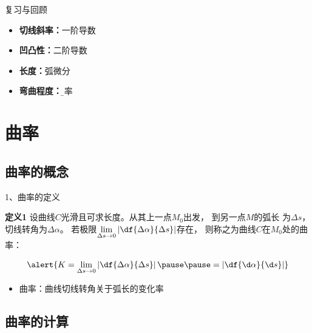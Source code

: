 \begin{frame}{复习与回顾}
	\linespread{1.5}
% 	
	
	\begin{itemize}
	  \item {\bf 切线斜率：}一阶导数
	  \item {\bf 凹凸性：}二阶导数
	  \item {\bf 长度：}弧微分\pause
	  \item {\bf 弯曲程度：}{\b 曲率}
	\end{itemize}
\end{frame}

\section{曲率}

\subsection{曲率的概念}



\begin{frame}{1、曲率的定义}
	\linespread{1.5}
	\pause
	\begin{block}{{\bf 定义1}\hfill }
		设曲线$C$光滑且可求长度。\pause 从其上一点$M_0$出发，
		到另一点$M$的弧长
		为$\Delta s$，切线转角为$\Delta\alpha$。
		\pause 若极限$\lim\limits_{\Delta s\to
		0}\left|\df{\Delta\alpha}{\Delta s}\right|$存在，
		则称之为{\bb 曲线$C$在$M_0$处的曲率：}
		
		\pause\vspace{-1em}
	$$\alert{K=\lim\limits_{\Delta s\to
				0}\left|\df{\Delta\alpha}{\Delta s}\right|\pause\pause
				=\left|\df{\d\alpha}{\d s}\right|}$$ 
	\end{block}\vspace{-1ex}
	\begin{itemize}
	  \item \alert{曲率：曲线切线转角关于弧长的变化率}
	\end{itemize}
\end{frame}

\subsection{曲率的计算}

